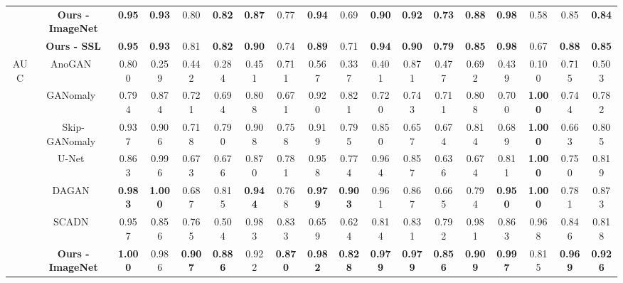 \documentclass[letterpaper]{article} \usepackage{aaai22}  \usepackage{times}  \usepackage{helvet}  \usepackage{courier}  \usepackage[hyphens]{url}  \usepackage{graphicx} \urlstyle{rm} \def\UrlFont{\rm}  \usepackage{natbib}  \usepackage{caption} \DeclareCaptionStyle{ruled}{labelfont=normalfont,labelsep=colon,strut=off} \frenchspacing  \setlength{\pdfpagewidth}{8.5in}  \setlength{\pdfpageheight}{11in}  \usepackage{algorithm}
\begin{document}
\begin{table*}[h]
{\begin{tabular}{@{}cccccccccccccccccc@{}}
         & \textbf{Ours - ImageNet}                                                  
         & {\textbf{0.95}}   & \textbf{0.93}     & 0.80     & \textbf{0.82}      & \textbf{0.87}    & 0.77  & \textbf{0.94}  & 0.69   & \textbf{0.90}   & \textbf{0.92}  & \textbf{0.73}  & \textbf{0.88}       & \textbf{0.98}       & 0.58  & 0.85   & \textbf{0.84}  \\
         & \textbf{Ours - SSL}                                                 
         & {\textbf{0.95}}   & \textbf{0.93}     & 0.81    & \textbf{0.82}      & \textbf{0.90}     & 0.74  & \textbf{0.89}  & 0.71   & \textbf{0.94}  & \textbf{0.90}   & \textbf{0.79}  & \textbf{0.85}       & \textbf{0.98}       & 0.67  & \textbf{0.88}   & \textbf{0.85}  \\ \midrule
 \multirow{7}{*}{AUC}        & AnoGAN~\cite{anogan}                                       
         & 0.800    & 0.259    & 0.442   & 0.284     & 0.451   & 0.711 & 0.567 & 0.337  & 0.401 & 0.871 & 0.477 & 0.692      & 0.439      & 0.100   & 0.715  & 0.503 \\
         & GANomaly~\cite{akcay2018ganomaly}                          
         & 0.794  & 0.874    & 0.721   & 0.694     & 0.808   & 0.671 & 0.920  & 0.821  & 0.720  & 0.743 & 0.711 & 0.808      & 0.700        & {\textbf{1.000}}     & 0.744  & 0.782 \\
         & Skip-GANomaly~\cite{akccay2019skip}                        & 0.937  & 0.906    & 0.718   & 0.790      & 0.908   & 0.758 & 0.919 & 0.795  & 0.850  & 0.657 & 0.674 & 0.814      & 0.689      & {\textbf{1.000}}    & 0.663  & 0.805 \\
     & U-Net~\cite{u-net}                                         & 0.863  & 0.996    & 0.673   & 0.676     & 0.870    & 0.781 & 0.958 & 0.774  & 0.964 & 0.857 & 0.636 & 0.674      & 0.811      & {\textbf{1.000}}     & 0.750   & 0.819 \\
         & DAGAN~\cite{DAGAN}                                         & {\textbf{0.983}}  & {\textbf{1.000}}        & 0.687   & 0.815     & {\textbf{0.944}}   & 0.768 & {\textbf{0.979}} & {\textbf{0.903}}  & 0.961 & 0.867 & 0.665 & 0.794      & {\textbf{0.950}}       & {\textbf{1.000}}     & 0.781  & 0.873 \\
         & SCADN~\cite{yan2021learning} & 0.957 & 0.856 & 0.765 & 0.504 & 0.983 & 0.833 & 0.659 & 0.624 & 0.814 & 0.831 & 0.792 & 0.981 & 0.863 & 0.968 & 0.846 & 0.818\\
         & \textbf{Ours - ImageNet}                                                  & {\textbf{1.000}}      & 0.986    & {\textbf{0.907}}   & {\textbf{0.886}}     & 0.922   & {\textbf{0.870}}  & {\textbf{0.982}} & {\textbf{0.828}}  & {\textbf{0.979}} & {\textbf{0.979}} & {\textbf{0.856}} & {\textbf{0.909}}     & {\textbf{0.997}}      & 0.815 & {\textbf{0.969 }} & {\textbf{0.926}} \\

\end{tabular}}
\end{table*}
\end{document}
